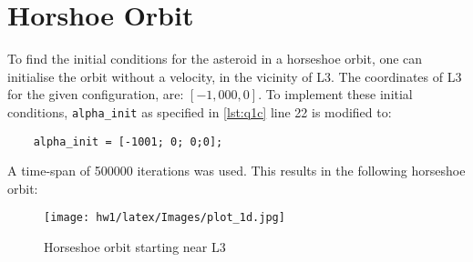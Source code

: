 \section{Horshoe Orbit}\label{sec:1d}
To find the initial conditions for the asteroid in a horseshoe orbit, one can initialise the orbit without a velocity, in the vicinity of L3. The coordinates of L3 for the given configuration, are: $[-1,000, 0]$\cite{lecture_notes}. To implement these initial conditions, \verb+alpha_init+ as specified in \cref{lst:q1c} line 22 is modified to:
\begin{verbatim}
    alpha_init = [-1001; 0; 0;0];
\end{verbatim}
A time-span of 500000 iterations was used. This results in the following horseshoe orbit:
\begin{figure}[H]
    \centering
    \texttt{[image: hw1/latex/Images/plot\_1d.jpg]}
    \caption{Horseshoe orbit starting near L3}
\end{figure}